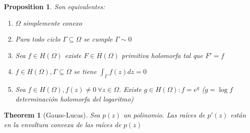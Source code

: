 \documentclass{myclass} \usepackage{verbatim}
\newtheorem*{theorem}{Theorem}
\newtheorem*{proposition}{Proposition}
\begin{document}
\begin{proposition} Son equivalentes:
\begin{enumerate}[topsep=-6pt, itemsep=0pt]
  \item $\Omega $ simplemente conexo
  \item Para todo ciclo $\Gamma \subseteq \Omega $ se cumple $\Gamma \sim 0$ 
  \item Sea $f\in H(\Omega )$ existe $F\in H(\Omega )$ primitiva holomorfa tal que $F' = f$
  \item $f\in H(\Omega ), \Gamma \subseteq \Omega$ se tiene $\int_\Gamma f(z)dz = 0$ 
  \item Sea  $f \in H(\Omega ), f(z)\neq 0 \ \forall z\in \Omega $. Existe $g \in H(\Omega ): f = e^g$ ($g=\log f$ determinación holomorfa del logaritmo)
\end{enumerate}
\end{proposition}

\begin{theorem}[Gauss-Lucas]
Sea $p(z)$ un polinomio. Las raíces de $p'(z)$ están en la envoltura convexa de las raíces de  $p(z)$
\end{theorem}
\end{document}
